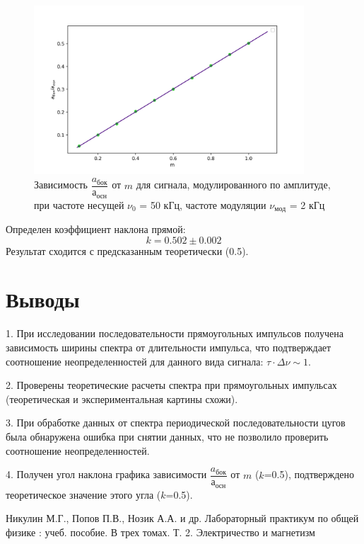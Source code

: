 \documentclass[a4paper,12pt]{article} %
\begin{document}
\begin{figure}[h!]
\begin{center}
\includegraphics[width=0.9\textwidth]{a(m)}
\caption{Зависимость $\dfrac{a_{бок}}{а_{осн}}$ от $m$ для сигнала, модулированного по амплитуде, при частоте несущей $\nu_0$ = 50 кГц, частоте модуляции $\nu_{мод}$ = 2 кГц} \label{mod_img}
\end{center}
\end{figure}
Определен коэффициент наклона прямой:
\begin{equation}
k = 0.502 \pm 0.002
\end{equation} 
Результат сходится с предсказанным теоретически (0.5).

\section{Выводы}


1. При исследовании последовательности прямоугольных импульсов получена зависимость ширины спектра от длительности импульса, что подтверждает соотношение неопределенностей для данного вида сигнала: $\tau \cdot \Delta\nu \sim 1$.

2. Проверены теоретические расчеты спектра при прямоугольных импульсах (теоретическая и экспериментальная картины схожи).

3. При обработке данных от спектра периодической последовательности цугов была обнаружена ошибка при снятии данных, что не позволило проверить соотношение неопределенностей.

4. Получен угол наклона графика зависимости $\dfrac{a_{бок}}{а_{осн}}$ от $m$ ($k$=0.5), подтверждено теоретическое значение этого угла ($k$=0.5).


\begin{thebibliography}{}
      Никулин М.Г., Попов П.В., Нозик А.А. и др. Лабораторный практикум по общей физике : учеб. пособие. В трех томах. Т. 2. Электричество и магнетизм
\end{thebibliography}
\end{document}
